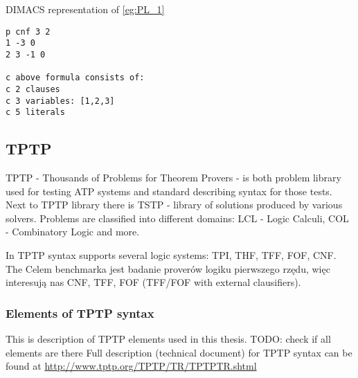 \begin{listing}
  \caption{DIMACS representation of \ref{eg:PL_1}}
  \begin{verbatim}
p cnf 3 2
1 -3 0
2 3 -1 0

c above formula consists of:
c 2 clauses
c 3 variables: [1,2,3]
c 5 literals
  \end{verbatim}
\end{listing}

\subsection{TPTP}

\gls{TPTP} \cite{Sut17} - Thousands of Problems for Theorem Provers - is both problem library used for testing \gls{ATP} systems and standard describing syntax for those tests. Next to TPTP library there is \gls{TSTP} - library of solutions produced by various solvers. Problems are classified into different domains: LCL - Logic Calculi, COL - Combinatory Logic and more.

In TPTP syntax supports several logic systems: \gls{TPI}, \gls{THF}, \gls{TFF}, \gls{FOF}, \gls{CNF}. 
The 
Celem benchmarka jest badanie proverów logiku pierwszego rzędu, więc interesują nas \gls{CNF}, \gls{TFF}, \gls{FOF} (TFF/FOF with external clausifiers).

\subsubsection{Elements of TPTP syntax}

This is description of TPTP elements used in this thesis. TODO: check if all elements are there
\newline
Full description (technical document) for TPTP syntax can be found at \url{http://www.tptp.org/TPTP/TR/TPTPTR.shtml}


